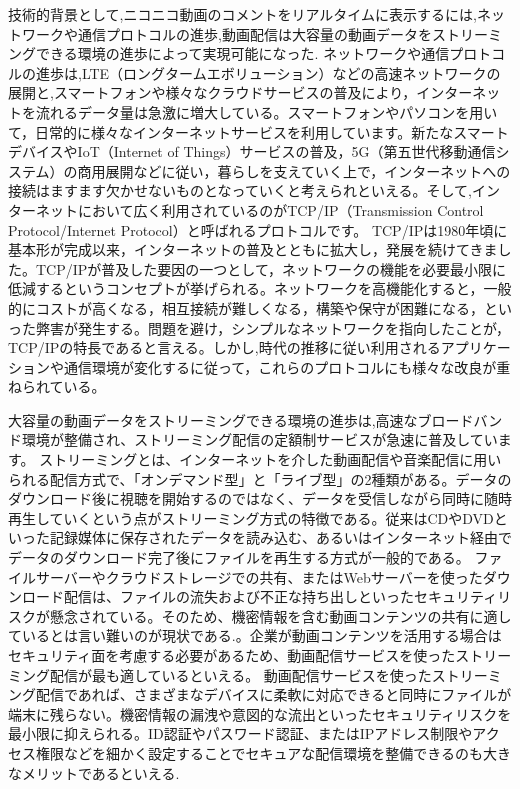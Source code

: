 技術的背景として,ニコニコ動画のコメントをリアルタイムに表示するには,ネットワークや通信プロトコルの進歩,動画配信は大容量の動画データをストリーミングできる環境の進歩によって実現可能になった.
ネットワークや通信プロトコルの進歩は,LTE（ロングタームエボリューション）などの高速ネットワークの展開と,スマートフォンや様々なクラウドサービスの普及により，インターネットを流れるデータ量は急激に増大している。スマートフォンやパソコンを用いて，日常的に様々なインターネットサービスを利用しています。新たなスマートデバイスやIoT（Internet of Things）サービスの普及，5G（第五世代移動通信システム）の商用展開などに従い，暮らしを支えていく上で，インターネットへの接続はますます欠かせないものとなっていくと考えられといえる。そして,インターネットにおいて広く利用されているのがTCP/IP（Transmission Control Protocol/Internet Protocol）と呼ばれるプロトコルです。
TCP/IPは1980年頃に基本形が完成以来，インターネットの普及とともに拡大し，発展を続けてきました。TCP/IPが普及した要因の一つとして，ネットワークの機能を必要最小限に低減するというコンセプトが挙げられる。ネットワークを高機能化すると，一般的にコストが高くなる，相互接続が難しくなる，構築や保守が困難になる，といった弊害が発生する。問題を避け，シンプルなネットワークを指向したことが，TCP/IPの特長であると言える。しかし,時代の推移に従い利用されるアプリケーションや通信環境が変化するに従って，これらのプロトコルにも様々な改良が重ねられている。

大容量の動画データをストリーミングできる環境の進歩は,高速なブロードバンド環境が整備され、ストリーミング配信の定額制サービスが急速に普及しています。
ストリーミングとは、インターネットを介した動画配信や音楽配信に用いられる配信方式で、「オンデマンド型」と「ライブ型」の2種類がある。データのダウンロード後に視聴を開始するのではなく、データを受信しながら同時に随時再生していくという点がストリーミング方式の特徴である。従来はCDやDVDといった記録媒体に保存されたデータを読み込む、あるいはインターネット経由でデータのダウンロード完了後にファイルを再生する方式が一般的である。
ファイルサーバーやクラウドストレージでの共有、またはWebサーバーを使ったダウンロード配信は、ファイルの流失および不正な持ち出しといったセキュリティリスクが懸念されている。そのため、機密情報を含む動画コンテンツの共有に適しているとは言い難いのが現状である.。企業が動画コンテンツを活用する場合はセキュリティ面を考慮する必要があるため、動画配信サービスを使ったストリーミング配信が最も適しているといえる。
動画配信サービスを使ったストリーミング配信であれば、さまざまなデバイスに柔軟に対応できると同時にファイルが端末に残らない。機密情報の漏洩や意図的な流出といったセキュリティリスクを最小限に抑えられる。ID認証やパスワード認証、またはIPアドレス制限やアクセス権限などを細かく設定することでセキュアな配信環境を整備できるのも大きなメリットであるといえる.	




